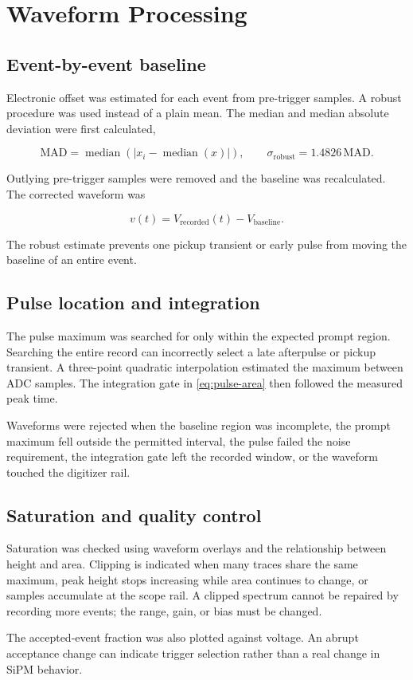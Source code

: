 \section{Waveform Processing}

\subsection{Event-by-event baseline}

Electronic offset was estimated for each event from pre-trigger samples. A robust procedure was used instead of a plain mean. The median and median absolute deviation were first calculated,

\begin{equation}
  \mathrm{MAD}=\operatorname{median}\left(\left|x_i-\operatorname{median}(x)\right|\right),
  \qquad
  \sigma_{\mathrm{robust}}=1.4826\,\mathrm{MAD}.
  \label{eq:mad}
\end{equation}

Outlying pre-trigger samples were removed and the baseline was recalculated. The corrected waveform was

\begin{equation}
  v(t)=V_{\mathrm{recorded}}(t)-V_{\mathrm{baseline}}.
\end{equation}

The robust estimate prevents one pickup transient or early pulse from moving the baseline of an entire event.

\subsection{Pulse location and integration}

The pulse maximum was searched for only within the expected prompt region. Searching the entire record can incorrectly select a late afterpulse or pickup transient. A three-point quadratic interpolation estimated the maximum between ADC samples. The integration gate in \cref{eq:pulse-area} then followed the measured peak time.

Waveforms were rejected when the baseline region was incomplete, the prompt maximum fell outside the permitted interval, the pulse failed the noise requirement, the integration gate left the recorded window, or the waveform touched the digitizer rail.

\subsection{Saturation and quality control}

Saturation was checked using waveform overlays and the relationship between height and area. Clipping is indicated when many traces share the same maximum, peak height stops increasing while area continues to change, or samples accumulate at the scope rail. A clipped spectrum cannot be repaired by recording more events; the range, gain, or bias must be changed.

The accepted-event fraction was also plotted against voltage. An abrupt acceptance change can indicate trigger selection rather than a real change in SiPM behavior.
